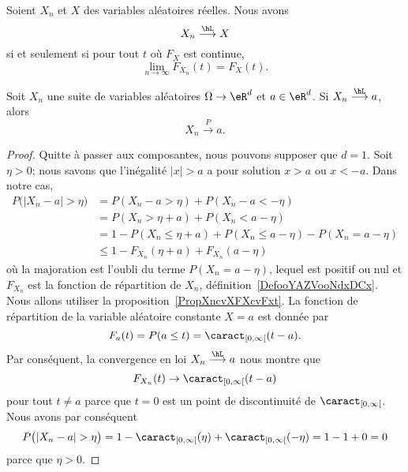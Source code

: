 \begin{proposition}     \label{PropXncvXFXcvFxt}
	Soient \( X_n\) et \( X\) des variables aléatoires réelles. Nous avons
	\begin{equation}
		X_n\stackrel{\hL}{\longrightarrow}X
	\end{equation}
	si et seulement si pour tout \( t\) où \( F_X\) est continue,
	\begin{equation}
		\lim_{n\to \infty} F_{X_n}(t)=F_X(t).
	\end{equation}
\end{proposition}

\begin{proposition}     \label{PropCvLfcvPsicst}
	Soit \( X_n\) une suite de variables aléatoires \( \Omega\to \eR^d\) et \( a\in\eR^d\). Si \( X_n\stackrel{\hL}{\longrightarrow}a\), alors
	\begin{equation}
		X_n\stackrel{P}{\longrightarrow}a.
	\end{equation}
\end{proposition}

\begin{proof}
	Quitte à passer aux composantes, nous pouvons supposer que \( d=1\). Soit \( \eta>0\); nous savons que l'inégalité \( | x |>a\) a pour solution \( x>a\) ou \( x<-a\). Dans notre cas,
	\begin{subequations}
		\begin{align}
			P\big( | X_n-a |>\eta \big) & =P(X_n-a>\eta)+P(X_n-a<-\eta)                        \\
			                            & =P(X_n>\eta+a)+P(X_n<a-\eta)                         \\
			                            & =1-P(X_n\leq \eta+a)+P(X_n\leq a-\eta)-P(X_n=a-\eta) \\
			                            & \leq 1-F_{X_n}(\eta+a)+F_{X_n}(a-\eta)
		\end{align}
	\end{subequations}
	où la majoration est l'oubli du terme \( P(X_n=a-\eta)\), lequel est positif ou nul et \( F_{X_n}\) est la fonction de répartition de \( X_n\), définition~\ref{DefooYAZVooNdxDCx}. Nous allons utiliser la proposition~\ref{PropXncvXFXcvFxt}. La fonction de répartition de la variable aléatoire constante \( X=a\) est donnée par
	\begin{equation}
		F_a(t)=P(a\leq t)=\caract_{\mathopen[ 0 , \infty \mathclose[}(t-a).
	\end{equation}
	Par conséquent, la convergence en loi \( X_n\stackrel{\hL}{\longrightarrow}a\) nous montre que
	\begin{equation}
		F_{X_n}(t)\to \caract_{\mathopen[ 0 , \infty \mathclose[}(t-a)
	\end{equation}
	pour tout \( t\neq a\) parce que \( t=0\) est un point de discontinuité de \( \caract_{\mathopen[ 0 , \infty \mathclose[}\). Nous avons par conséquent
	\begin{equation}
		P\big( | X_n-a |>\eta \big)=1-\caract_{\mathopen[ 0 , \infty \mathclose[}(\eta)+\caract_{\mathopen[ 0 , \infty \mathclose[}(-\eta)=1-1+0=0
	\end{equation}
	parce que \( \eta>0\).
\end{proof}

